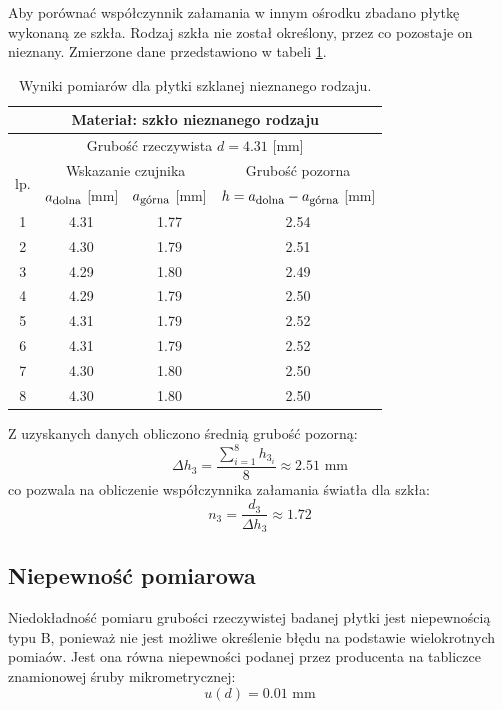 \documentclass[a4paper,12pts]{article}
\begin{document}
	Aby porównać współczynnik załamania w innym ośrodku zbadano płytkę wykonaną ze szkła. Rodzaj szkła nie został określony, przez co pozostaje on nieznany. Zmierzone dane przedstawiono w tabeli \ref{szklo}.
		\begin{table}[!h]
		\centering
		\begin{tabular}{| c | c | c | c |}
			\hline
			\multicolumn{4}{|c|}{Materiał: szkło nieznanego rodzaju}  \\ \hline
			\multicolumn{4}{|c|}{Grubość rzeczywista $d = 4.31$ [mm] } \\ \hline
			\multirow{2}{*}{lp.} & \multicolumn{2}{|c|}{Wskazanie czujnika} & Grubość pozorna \\ \cline{2-4}
			& $a_{\textrm{\footnotesize dolna}}$ [mm] & $a_{\textrm{\footnotesize górna}}$ [mm] & $h = a_{\textrm{\footnotesize dolna}} - a_{\textrm{\footnotesize górna}}$ [mm] \\ \hline
			1  & 4.31 & 1.77 & 2.54 \\ \hline
			2  & 4.30 & 1.79 & 2.51 \\ \hline
			3  & 4.29 & 1.80 & 2.49 \\ \hline
			4  & 4.29 & 1.79 & 2.50 \\ \hline
			5  & 4.31 & 1.79 & 2.52 \\ \hline
			6  & 4.31 & 1.79 & 2.52 \\ \hline
			7  & 4.30 & 1.80 & 2.50 \\ \hline
			8  & 4.30 & 1.80 & 2.50 \\ \hline
		\end{tabular}
		\caption{Wyniki pomiarów dla płytki szklanej nieznanego rodzaju.}
		\label{szklo}
	\end{table}

	Z uzyskanych danych obliczono średnią grubość pozorną:
	\begin{equation}
		\Delta h_3 = \frac{\sum_{i = 1}^{8} h_{3_i}}{8} \approx 2.51 \textrm{ mm}
	\end{equation}
	co pozwala na obliczenie współczynnika załamania światła dla szkła:
	\begin{equation}
		n_3 = \frac{d_3}{\Delta h_3} \approx 1.72
	\end{equation}
		
	\subsection{Niepewność pomiarowa}
	Niedokładność pomiaru grubości rzeczywistej badanej płytki jest niepewnością typu B, ponieważ nie jest możliwe określenie błędu na podstawie wielokrotnych pomiaów. Jest ona równa niepewności podanej przez producenta na tabliczce znamionowej śruby mikrometrycznej:
	\begin{equation}
		u(d) = 0.01 \textrm{ mm}
	\end{equation}
	
\end{document}
